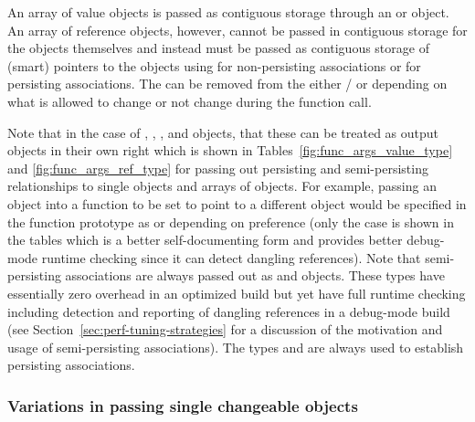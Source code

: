 \documentclass[pdf,ps2pdf,11pt]{SANDreport}
\begin{document}
An array of value objects is passed as contiguous storage through an
{} or {} object.  An
array of reference objects, however, cannot be passed in contiguous
storage for the objects themselves and instead must be passed as
contiguous storage of (smart) pointers to the objects using
{} for non-persisting
associations or {} for
persisting associations.  The {} can be removed from the
either {}/{} or {} depending on what
is allowed to change or not change during the function call.

Note that in the case of {}, {}, {},
and {} objects, that these can be treated as output
objects in their own right which is shown in
Tables~\ref{fig:func_args_value_type} and
{}\ref{fig:func_args_ref_type} for passing out persisting and
semi-persisting relationships to single objects and arrays of objects.
For example, passing an {} object into a function to be
set to point to a different {} object would be specified in the
function prototype as {} or {}
depending on preference (only the case {} is
shown in the tables which is a better self-documenting form and
provides better debug-mode runtime checking since it can detect
dangling references).  Note that semi-persisting associations are
always passed out as {} and {} objects.  These
types have essentially zero overhead in an optimized build but yet
have full runtime checking including detection and reporting of
dangling references in a debug-mode build (see
Section~\ref{sec:perf-tuning-strategies} for a discussion of the
motivation and usage of semi-persisting associations).  The types
{} and {} are always used to establish
persisting associations.


%
{}\subsubsection*{Variations in passing single changeable objects}
\label{sec:vars-passing-single-objs}
%
\end{document}

